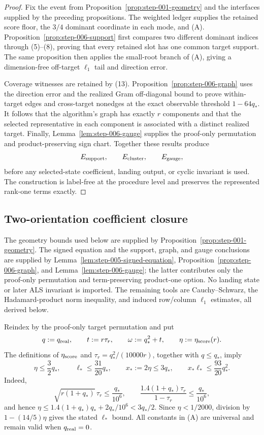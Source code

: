\begin{proof}
Fix the event from Proposition~\ref{prop:step-001-geometry} and the
interfaces supplied by the preceding propositions. The weighted ledger
supplies the retained score floor, the \(3/4\) dominant coordinate in each
mode, and (A). Proposition~\ref{prop:step-006-support} first compares two
different dominant indices through (5)--(8), proving that every retained
slot has one common target support. The same proposition then applies the
small-root branch of (A), giving a dimension-free off-target \(\ell_1\) tail
and direction error.

Coverage witnesses are retained by (13). Proposition~\ref{prop:step-006-graph}
uses the direction error and the realized Gram off-diagonal bound to prove
within-target edges and cross-target nonedges at the exact observable
threshold \(1-64q_*\). It follows that the algorithm's graph has exactly
\(r\) components and that the selected representative in each component is
associated with a distinct realized target. Finally,
Lemma~\ref{lem:step-006-gauge} supplies the proof-only permutation and
product-preserving sign chart. Together these results produce
\[
 E_{\rm support},\qquad E_{\rm cluster},\qquad E_{\rm gauge},
\]
before any selected-state coefficient, landing output, or cyclic invariant is
used. The construction is label-free at the procedure level and preserves
the represented rank-one terms exactly.
\end{proof}

\subsection{Two-orientation coefficient closure}\label{app:step-007}

The geometry bounds used below are supplied by
Proposition~\ref{prop:step-001-geometry}. The signed equation and the support,
graph, and gauge conclusions are supplied by
Lemma~\ref{lem:step-005-signed-equation}, Proposition~\ref{prop:step-006-graph},
and Lemma~\ref{lem:step-006-gauge}; the latter contributes only the
proof-only permutation and term-preserving product-one option. No landing
state or later ALS invariant is imported. The remaining tools are
Cauchy--Schwarz, the Hadamard-product norm inequality, and induced row/column
$\ell_1$ estimates, all derived below.

Reindex by the proof-only target permutation and put
\[
q:=q_{\rm real},\qquad t:=r\tau_r,\qquad
\omega:=q_*^2+t,\qquad \eta:=\eta_{\rm score}(r).
\]
The definitions of $\eta_{\rm score}$ and
$\tau_r=q_*^2/(10000r)$, together with $q\le q_*$, imply
\[
\eta\le\frac32q_*,\qquad \ell_*\le\frac{31}{20}q_*,\qquad
x_*:=2\eta\le3q_*,\qquad x_*\ell_*\le\frac{93}{20}q_*^2.
\tag{A}
\]
Indeed,
\[
\sqrt{r(1+q_*)}\,\tau_r\le\frac{q_*}{10^6},\qquad
\frac{1.4(1+q_*)\tau_r}{1-\tau_r}\le\frac{q_*}{10^6},
\]
and hence
$\eta\le1.4(1+q_*)q_*+2q_*/10^6<3q_*/2$. Since
$\eta<1/2000$, division by $1-(14/5)\eta$ gives the stated $\ell_*$ bound.
All constants in (A) are universal and remain valid when $q_{\rm real}=0$.


